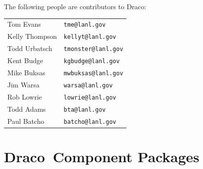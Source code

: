 \documentclass[11pt]{nmemo}
\newcommand{\draco}{Draco}
\begin{document}
The following people are contributors to \draco:
\begin{center}
  \begin{tabular}{ll}
    Tom Evans & \texttt{tme@lanl.gov} \\
    Kelly Thompson & \texttt{kellyt@lanl.gov} \\
    Todd Urbatsch & \texttt{tmonster@lanl.gov} \\
    Kent Budge & \texttt{kgbudge@lanl.gov} \\
    Mike Buksas & \texttt{mwbuksas@lanl.gov} \\
    Jim Warsa & \texttt{warsa@lanl.gov} \\
    Rob Lowrie & \texttt{lowrie@lanl.gov} \\
    Todd Adams & \texttt{bta@lanl.gov} \\
    Paul Batcho & \texttt{batcho@lanl.gov} \\
  \end{tabular}
\end{center}


\section{\draco\ Component Packages}
\end{document}
